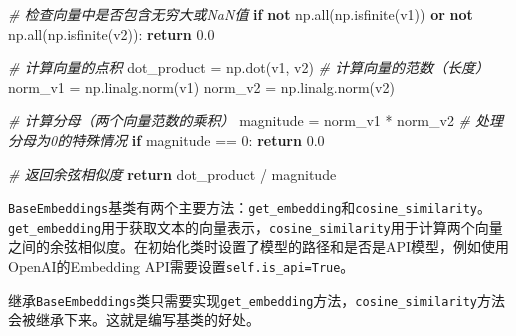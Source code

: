 \documentclass[
]{article}
\newenvironment{Shaded}{}{}
\newcommand{\BuiltInTok}[1]{\textcolor[rgb]{0.00,0.50,0.00}{#1}}
\newcommand{\CommentTok}[1]{\textcolor[rgb]{0.38,0.63,0.69}{\textit{#1}}}
\newcommand{\ControlFlowTok}[1]{\textcolor[rgb]{0.00,0.44,0.13}{\textbf{#1}}}
\newcommand{\DecValTok}[1]{\textcolor[rgb]{0.25,0.63,0.44}{#1}}
\newcommand{\FloatTok}[1]{\textcolor[rgb]{0.25,0.63,0.44}{#1}}
\newcommand{\KeywordTok}[1]{\textcolor[rgb]{0.00,0.44,0.13}{\textbf{#1}}}
\newcommand{\NormalTok}[1]{#1}
\newcommand{\OperatorTok}[1]{\textcolor[rgb]{0.40,0.40,0.40}{#1}}
\begin{document}
\begin{Shaded}
\begin{Highlighting}[]
        \CommentTok{\# 检查向量中是否包含无穷大或NaN值}
        \ControlFlowTok{if} \KeywordTok{not}\NormalTok{ np.}\BuiltInTok{all}\NormalTok{(np.isfinite(v1)) }\KeywordTok{or} \KeywordTok{not}\NormalTok{ np.}\BuiltInTok{all}\NormalTok{(np.isfinite(v2)):}
            \ControlFlowTok{return} \FloatTok{0.0}

        \CommentTok{\# 计算向量的点积}
\NormalTok{        dot\_product }\OperatorTok{=}\NormalTok{ np.dot(v1, v2)}
        \CommentTok{\# 计算向量的范数（长度）}
\NormalTok{        norm\_v1 }\OperatorTok{=}\NormalTok{ np.linalg.norm(v1)}
\NormalTok{        norm\_v2 }\OperatorTok{=}\NormalTok{ np.linalg.norm(v2)}
        
        \CommentTok{\# 计算分母（两个向量范数的乘积）}
\NormalTok{        magnitude }\OperatorTok{=}\NormalTok{ norm\_v1 }\OperatorTok{*}\NormalTok{ norm\_v2}
        \CommentTok{\# 处理分母为0的特殊情况}
        \ControlFlowTok{if}\NormalTok{ magnitude }\OperatorTok{==} \DecValTok{0}\NormalTok{:}
            \ControlFlowTok{return} \FloatTok{0.0}
            
        \CommentTok{\# 返回余弦相似度}
        \ControlFlowTok{return}\NormalTok{ dot\_product }\OperatorTok{/}\NormalTok{ magnitude}
\end{Highlighting}
\end{Shaded}

\texttt{BaseEmbeddings}基类有两个主要方法：\texttt{get\_embedding}和\texttt{cosine\_similarity}。\texttt{get\_embedding}用于获取文本的向量表示，\texttt{cosine\_similarity}用于计算两个向量之间的余弦相似度。在初始化类时设置了模型的路径和是否是API模型，例如使用OpenAI的Embedding
API需要设置\texttt{self.is\_api=True}。

继承\texttt{BaseEmbeddings}类只需要实现\texttt{get\_embedding}方法，\texttt{cosine\_similarity}方法会被继承下来。这就是编写基类的好处。
\end{document}
